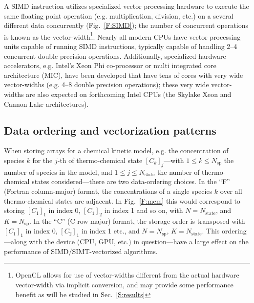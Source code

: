 \documentclass[12pt]{ussci}
\begin{document}
A SIMD instruction utilizes specialized vector processing hardware to execute the same floating point operation (e.g. multiplication, division, etc.) on a several different data concurrently (Fig.~\ref{F:SIMD}); the number of concurrent operations is known as the vector-width\footnote{OpenCL allows for use of vector-widths different from the actual hardware vector-width via implicit conversion, and may provide some performance benefit as will be studied in Sec.~\ref{S:results}}.
Nearly all modern CPUs have vector processing units capable of running SIMD instructions, typically capable of handling 2--4 concurrent double precision operations.
Additionally, specialized hardware accelerators, e.g. Intel's Xeon Phi co-processor or multi integrated core architecture (MIC), have been developed that have tens of cores with very wide vector-widths (e.g. 4--8 double precision operations); these very wide vector-widths are also expected on forthcoming Intel CPUs (the Skylake Xeon and Cannon Lake architectures).

\subsection{Data ordering and vectorization patterns}
\label{S:data}
When storing arrays for a chemical kinetic model, e.g. the concentration of species $k$ for the $j$-th of thermo-chemical state $[C_k]_j$---with $1 \le k \le N_{\text{sp}}$ the number of species in the model, and $1 \le j \le N_{\text{state}}$ the number of thermo-chemical states considered---there are two data-ordering choices.
In the ``F'' (Fortran column-major) format, the concentrations of a single species $k$ over all thermo-chemical states are adjacent.
In Fig.~\ref{F:mem} this would correspond to storing $[C_1]_1$ in index \num{0}, $[C_1]_2$ in index \num{1} and so on, with $N = N_{\text{state}}$, and $K = N_{\text{sp}}$.
In the ``C'' (C row-major) format, the storage order is transposed with $[C_1]_1$ in index \num{0}, $[C_2]_1$ in index \num{1} etc., and $N = N_{\text{sp}}$, $K = N_{\text{state}}$.
This ordering---along with the device (CPU, GPU, etc.) in question---have a large effect on the performance of SIMD\slash SIMT-vectorized algorithms.
\end{document}
